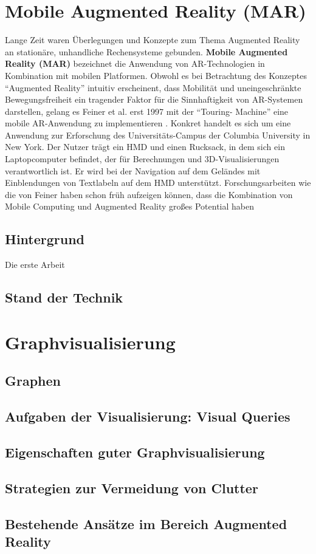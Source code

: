 \section{Mobile Augmented Reality (MAR)}
\label{sec:sota:mar}
Lange Zeit waren Überlegungen und Konzepte zum Thema Augmented Reality an stationäre, unhandliche Rechensysteme gebunden.   \textbf{Mobile Augmented Reality (MAR)} bezeichnet die Anwendung von AR-Technologien in Kombination mit mobilen Platformen. Obwohl es bei Betrachtung des Konzeptes ``Augmented Reality'' intuitiv erscheinent, dass Mobilität und uneingeschränkte Bewegungsfreiheit ein tragender Faktor für die Sinnhaftigkeit von AR-Systemen darstellen, gelang es Feiner et al. erst 1997 mit der ``Touring- Machine'' eine mobile AR-Anwendung zu implementieren \cite{Feiner1997}. Konkret handelt es sich um eine Anwendung zur Erforschung des Universitäts-Campus der Columbia University in New York. Der Nutzer trägt ein HMD und einen Rucksack, in dem sich ein Laptopcomputer befindet, der für Berechnungen und 3D-Visualisierungen verantwortlich ist. Er wird bei der Navigation auf dem Geländes mit Einblendungen von Textlabeln auf dem HMD unterstützt. Forschungsarbeiten wie die von Feiner haben schon früh aufzeigen können, dass die Kombination von Mobile Computing und Augmented Reality großes Potential haben

\subsection{Hintergrund}
Die erste Arbeit 
\subsection{Stand der Technik}

\Blindtext[3][2]


\section{Graphvisualisierung}
\label{sec:sota:visualization}
\subsection{Graphen}
\subsection{Aufgaben der Visualisierung: Visual Queries}
\subsection{Eigenschaften guter Graphvisualisierung}
\subsection{Strategien zur Vermeidung von Clutter}
\subsection{Bestehende Ansätze im Bereich Augmented Reality}
\Blindtext[2][1]
